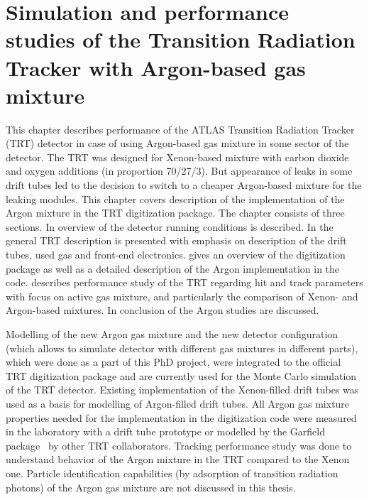 \chapter{Simulation and performance studies of the Transition Radiation Tracker with Argon-based gas mixture}
\label{chap:TRT}


This chapter describes performance of the ATLAS Transition Radiation Tracker (TRT) detector in case of using 
Argon-based gas mixture in some sector of the detector.
The TRT was designed for Xenon-based mixture with carbon dioxide and oxygen additions (in proportion 70/27/3).
But appearance of leaks in some drift tubes led to the decision to switch to a cheaper Argon-based mixture for the leaking modules.
This chapter covers description of the implementation of the Argon mixture in the TRT digitization package.
The chapter consists of three sections. In  overview of the detector running conditions is described. In  the general TRT description is presented with emphasis on description of the drift tubes, used gas and front-end electronics.
 gives an overview of the digitization package as well as a detailed description of the Argon implementation in the code.
 describes performance study of the TRT regarding hit and track parameters with focus on active gas mixture, and particularly the comparison of 
Xenon- and Argon-based mixtures.
In  conclusion of the Argon studies are discussed.

Modelling of the new Argon gas mixture and the new detector configuration (which allows to simulate detector with different gas mixtures in different parts), 
which were done as a part of this PhD project, were integrated to the official TRT digitization package and are currently used for the Monte Carlo simulation of the TRT detector. 
Existing implementation of the Xenon-filled drift tubes was used as a basis for modelling of Argon-filled drift tubes.
All Argon gas mixture properties needed for the implementation in the digitization code were measured in the laboratory with a drift tube prototype 
or modelled by the Garfield package~\cite{garfield_program} by other TRT collaborators.
Tracking performance study was done to understand behavior of the Argon mixture in the TRT compared to the Xenon one.
Particle identification capabilities (by adsorption of transition radiation photons) of the Argon gas mixture are not discussed in this thesis.

